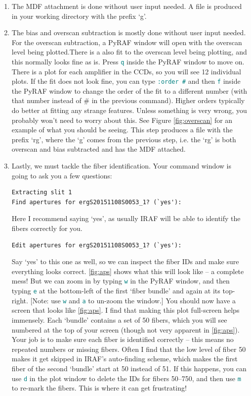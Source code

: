 \documentclass[12pt]{report}
\newcommand{\ty}[1]{\textcolor{teal}{\texttt{#1}}}
\begin{document}
\begin{enumerate}
\item The MDF attachment is done without user input needed. A file is produced in your working directory with the prefix `g'.
\item The bias and overscan subtraction is mostly done without user input needed. For the overscan subtraction, a PyRAF window will open with the overscan level being plotted.There is a also fit to the overscan level being plotting, and this normally looks fine as is. Press \ty{q} inside the PyRAF window to move on. There is a plot for each amplifier in the CCDs, so you will see 12 individual plots. If the fit does not look fine, you can type \ty{:order \#} and then \ty{f} inside the PyRAF window to change the order of the fit to a different number (with that number instead of \# in the previous command). Higher orders typically do better at fitting any strange features. Unless something is very wrong, you probably won't need to worry about this. See Figure \autoref{fig:overscan} for an example of what you should be seeing. This step produces a file with the prefix `rg', where the `g' comes from the previous step, i.e. the `rg' is both overscan and bias subtracted and has the MDF attached.
\item Lastly, we must tackle the fiber identification. Your command window is going to ask you a few questions:
\begin{verbatim}
Extracting slit 1
Find apertures for ergS20151108S0053_1? (`yes'): 
\end{verbatim}
Here I recommend saying `yes', as usually IRAF will be able to identify the fibers correctly for you. 
\begin{verbatim}
Edit apertures for ergS20151108S0053_1? (`yes'): 
\end{verbatim}
Say `yes' to this one as well, so we can inspect the fiber IDs and make sure everything looks correct. \autoref{fig:aps} shows what this will look like -- a complete mess! But we can zoom in by typing \ty{w} in the PyRAF window, and then typing \ty{e} at the bottom-left of the first `fiber bundle' and again at its top-right. [Note: use \ty{w} and \ty{a} to un-zoom the window.] You should now have a screen that looks like \autoref{fig:aps}. I find that making this plot full-screen helps immensely. Each `bundle' contains a set of 50 fibers, which you will see numbered at the top of your screen (though not very apparent in \autoref{fig:aps}). Your job is to make sure each fiber is identified correctly -- this means no repeated numbers or missing fibers. Often I find that the low level of fiber 50 makes it get skipped in IRAF's auto-finding scheme, which makes the first fiber of the second `bundle' start at 50 instead of 51. If this happens, you can use \ty{d} in the plot window to delete the IDs for fibers 50--750, and then use \ty{m} to re-mark the fibers. This is where it can get frustrating! \\


\end{enumerate}
\end{document}
